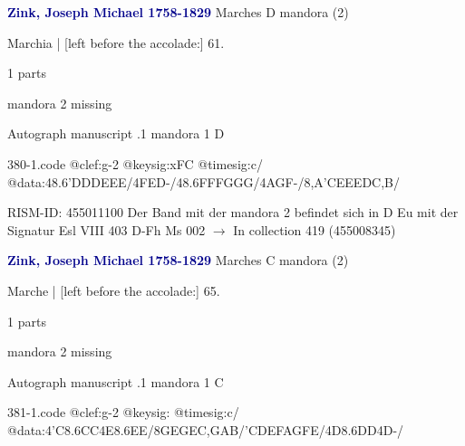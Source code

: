 \documentclass[twocolumn]{book}
\begin{document}
\newline \par \vspace{7pt} \textcolor{darkblue}{\textbf{Zink, Joseph Michael  1758-1829}}
\newline Marches  D  
\newline mandora (2)
\newline \begin{itshape}[f.32r, at left:] Marchia | [left before the accolade:] 61.\end{itshape} 
\newline \textcolor{darkblue}{}  1 parts  
\newline \begin{small} mandora 2 missing\end{small} 
\newline Autograph manuscript
.1  mandora 1  D  
\begin{filecontents*}{380-1.code}
@clef:g-2
@keysig:xFC
@timesig:c/
@data:48.6'D{DD}E{EE}/4FED-/48.6F{FF}G{GG}/4AGF-/8,A'CEEEDC,B/
\end{filecontents*}
\newline
%

\newline RISM-ID: 455011100
\newline Der Band mit der mandora 2 befindet sich in D Eu mit der Signatur Esl VIII 403
\newline D-Fh  Ms 002
\newline $\rightarrow$ In collection 419 (455008345)

\newline \par \vspace{7pt} \textcolor{darkblue}{\textbf{Zink, Joseph Michael  1758-1829}}
\newline Marches  C  
\newline mandora (2)
\newline \begin{itshape}[f.33v, at left:] Marche | [left before the accolade:] 65.\end{itshape} 
\newline \textcolor{darkblue}{}  1 parts  
\newline \begin{small} mandora 2 missing\end{small} 
\newline Autograph manuscript
.1  mandora 1  C  
\begin{filecontents*}{381-1.code}
@clef:g-2
@keysig:
@timesig:c/
@data:4'C{8.6CC}4E{8.6EE}/{8GEGE}{C,GAB}/{'CDEF}{AGFE}/4D{8.6DD}4D-/
\end{filecontents*}
\newline
%
\end{document}
